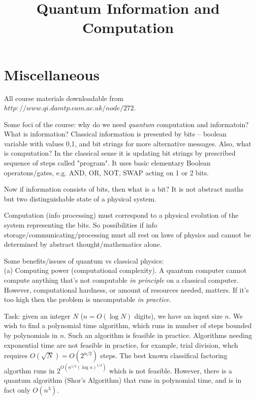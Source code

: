 \documentclass[a4paper]{article}
\begin{document}
\title{Quantum Information and Computation}

\maketitle

\newpage

\tableofcontents

\newpage

\section{Miscellaneous}

All course materials downloadable from $http://www.qi.damtp.cam.ac.uk/node/272$.

Some foci of the course: why do we need \emph{quantum} computation and informatoin? What is information? Classical information is presented by bits -- boolean variable with values 0,1, and bit strings for more alternative messages. Also, what is computation? In the classical sense it is updating bit strings by prescribed sequence of steps called "program". It uses basic elementary Boolean operatons/gates, e.g. AND, OR, NOT, SWAP acting on 1 or 2 bits.

Now if information consists of bits, then what is a bit? It is not abstract maths but two distinguishable state of a physical system.

Computation (info processing) must correspond to a physical evolution of the system representing the bits. So possibilities if info storage/communicating/processing must all rest on laws of physics and cannot be determined by abstract thought/mathematics alone.

Some benefits/issues of quantum vs classical physics:\\
(a) Computing power (computational complexity). A quantum computer cannot compute anything that's not computable \emph{in principle} on a classical computer. However, computational hardness, or amount of resources needed, matters. If it's too high then the problem is uncomputable \emph{in practice}.

\begin{eg}
Task: given an integer $N$ ($n=O(\log N)$ digits), we have an input size $n$. We wish to find a polynomial time algorithm, which runs in number of steps bounded by polynomials in $n$. Such an algorithm is feasible in practice. Algorithms needing exponential time are not feasible in practice, for example, trial division, whch requires $O(\sqrt{N}) = O(2^{n/2})$ steps. The best known classifical factoring algorthm runs in $2^{O(n^{1/3}(\log n)^{1/3})}$ which is not feasible. However, there is a quantum algorithm (Shor's Algorithm) that runs in polynomial time, and is in fact only $O(n^3)$.
\end{eg}
\end{document}
